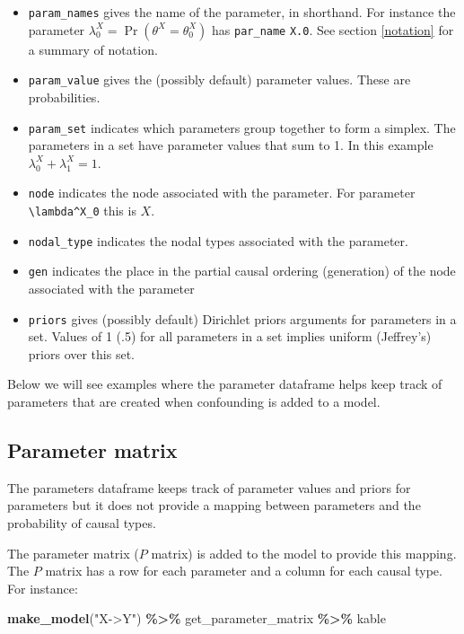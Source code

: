 \documentclass[
  12pt,
]{book}
\newenvironment{Shaded}{\begin{snugshade}}{\end{snugshade}}
\newcommand{\FunctionTok}[1]{\textcolor[rgb]{0.13,0.29,0.53}{\textbf{#1}}}
\newcommand{\NormalTok}[1]{#1}
\newcommand{\SpecialCharTok}[1]{\textcolor[rgb]{0.81,0.36,0.00}{\textbf{#1}}}
\newcommand{\StringTok}[1]{\textcolor[rgb]{0.31,0.60,0.02}{#1}}
\providecommand{\tightlist}{%
  \setlength{\itemsep}{0pt}\setlength{\parskip}{0pt}}
\begin{document}
\begin{itemize}
\tightlist
\item
  \texttt{param\_names} gives the name of the parameter, in shorthand. For instance the parameter \(\lambda^X_0 = \Pr(\theta^X = \theta^X_0)\) has \texttt{par\_name} \texttt{X.0}. See section \ref{notation} for a summary of notation.
\item
  \texttt{param\_value} gives the (possibly default) parameter values. These are probabilities.\\
\item
  \texttt{param\_set} indicates which parameters group together to form a simplex. The parameters in a set have parameter values that sum to 1. In this example \(\lambda^X_0 + \lambda^X_1 = 1\).
\item
  \texttt{node} indicates the node associated with the parameter. For parameter \texttt{\textbackslash{}lambda\^{}X\_0} this is \(X\).
\item
  \texttt{nodal\_type} indicates the nodal types associated with the parameter.
\item
  \texttt{gen} indicates the place in the partial causal ordering (generation) of the node associated with the parameter
\item
  \texttt{priors} gives (possibly default) Dirichlet priors arguments for parameters in a set. Values of 1 (.5) for all parameters in a set implies uniform (Jeffrey's) priors over this set.
\end{itemize}

Below we will see examples where the parameter dataframe helps keep track of parameters that are created when confounding is added to a model.

\hypertarget{parameter-matrix}{%
\subsection{Parameter matrix}\label{parameter-matrix}}

The parameters dataframe keeps track of parameter values and priors for parameters but it does not provide a mapping between parameters and the probability of causal types.

The parameter matrix (\(P\) matrix) is added to the model to provide this mapping. The \(P\) matrix has a row for each parameter and a column for each causal type. For instance:

\begin{Shaded}
\begin{Highlighting}[]
\FunctionTok{make\_model}\NormalTok{(}\StringTok{"X{-}\textgreater{}Y"}\NormalTok{) }\SpecialCharTok{\%\textgreater{}\%}\NormalTok{ get\_parameter\_matrix }\SpecialCharTok{\%\textgreater{}\%}
\NormalTok{  kable}
\end{Highlighting}
\end{Shaded}
\end{document}
